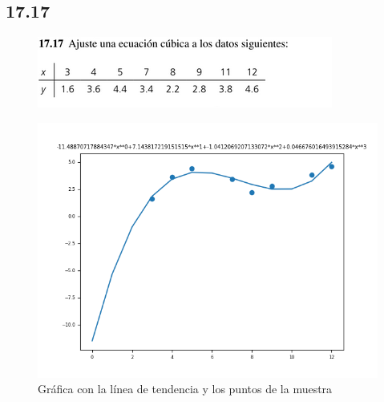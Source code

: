 \documentclass[12pt,oneside,FLEQN]{report}
\begin{document}
{		\subsection{17.17}
			\begin{figure}[!h]
				\centering
				\includegraphics[scale=0.5]{1717e.png}
				\caption{}
			\end{figure}
			\begin{figure}[!h]
				\centering
				\includegraphics[scale=0.3]{1717.png}
				\caption{Gráfica con la línea de tendencia y los puntos de la muestra}
			\end{figure}
}
\end{document}
